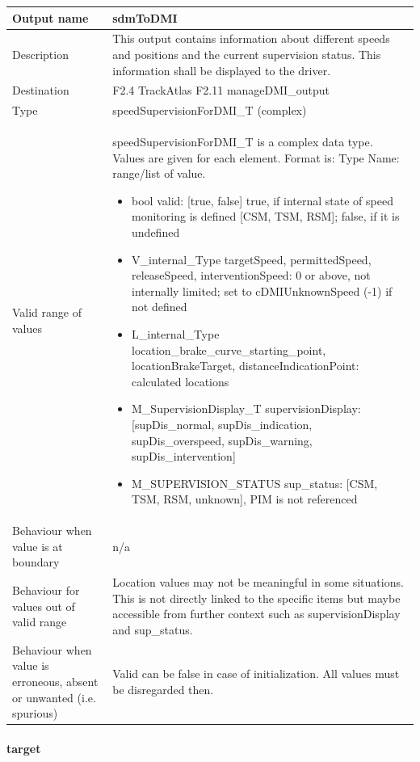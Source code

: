 \begin{longtable}{p{}p{}}
\toprule
Output name				& sdmToDMI \\
\midrule
Description				& This output contains information about different speeds and positions and the current supervision status. This information shall be displayed to the driver. \\
\midrule
Destination				& F2.4 TrackAtlas\newline
F2.11 manageDMI\_output
\\
\midrule
Type					& speedSupervisionForDMI\_T (complex)\\
\midrule
Valid range of values	& speedSupervisionForDMI\_T is a complex data type. Values are given for each element. Format is: Type Name: range/list of value.
\begin{itemize}
\item bool valid: [true, false] true, if internal state of speed monitoring is defined [CSM, TSM, RSM]; false, if it is undefined
\item V\_internal\_Type targetSpeed, permittedSpeed, releaseSpeed, interventionSpeed: 0 or above, not internally limited; set to cDMIUnknownSpeed (-1) if not defined
\item L\_internal\_Type location\_brake\_curve\_starting\_point, locationBrakeTarget, distanceIndicationPoint: calculated locations
\item M\_SupervisionDisplay\_T supervisionDisplay: [supDis\_normal, supDis\_indication, supDis\_overspeed, supDis\_warning, supDis\_intervention]
\item M\_SUPERVISION\_STATUS sup\_status: [CSM, TSM, RSM, unknown], PIM is not referenced
\end{itemize}\\
\midrule
Behaviour when value is at boundary	& n/a \\
\midrule
Behaviour for values out of valid range	& Location values may not be meaningful in some situations. This is not directly linked to the specific items but maybe accessible from further context such as supervisionDisplay and sup\_status.  \\
\midrule
Behaviour when value is erroneous, absent or unwanted (i.e. spurious) & Valid can be false in case of initialization. All values must be disregarded then. \\
\bottomrule
\end{longtable}


\paragraph{target}\label{p:SDM_target}

